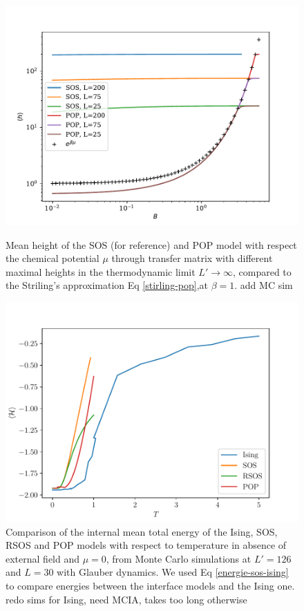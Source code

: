 \begin{figure}
\centering
\includegraphics{pop/hauteur-tm-pop-sos.pdf}
\caption{Mean height of the SOS (for reference) and POP model with respect the chemical potential $\mu$ through transfer matrix with different maximal heights in the thermodynamic limit $L'\to \infty$, compared to the Striling's approximation Eq \eqref{stirling-pop},at $\beta=1$. {\color{red} add MC sim}}
\label{haut-tm-pop} 
\includegraphics{pop/comparaison-modeles.pdf}
\caption{Comparison of the internal mean total energy of the Ising, SOS, RSOS and POP models with respect to temperature in absence of external field and $\mu=0$, from Monte Carlo simulations at $L'=126$ and $L=30$ with Glauber dynamics. We used Eq \ref{energie-sos-ising} to compare energies between the interface models and the Ising one.
{\color{red} redo sims for Ising, need MCIA, takes too long otherwise}}
\label{comp-models}
\end{figure}

